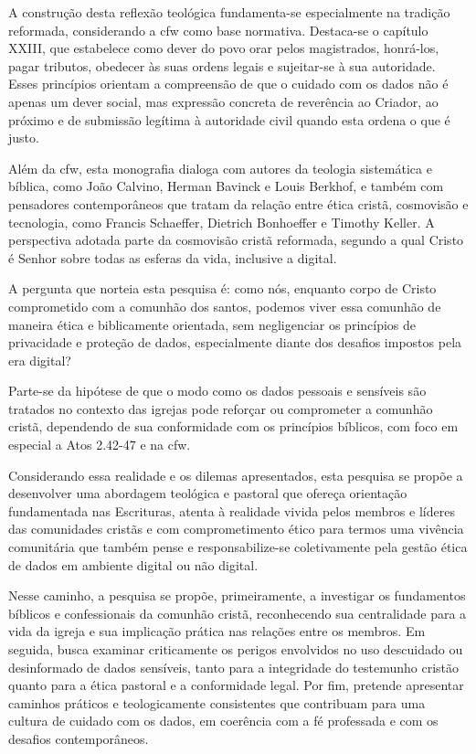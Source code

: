 A construção desta reflexão teológica fundamenta-se especialmente na tradição reformada, considerando a \gls{cfw} como base normativa. Destaca-se o capítulo XXIII, que estabelece como dever do povo orar pelos magistrados, honrá-los, pagar tributos, obedecer às suas ordens legais e sujeitar-se à sua autoridade. Esses princípios orientam a compreensão de que o cuidado com os dados não é apenas um dever social, mas expressão concreta de reverência ao Criador, ao próximo e de submissão legítima à autoridade civil quando esta ordena o que é justo.

Além da \gls{cfw}, esta monografia dialoga com autores da teologia sistemática e bíblica, como João Calvino, Herman Bavinck e Louis Berkhof, e também com pensadores contemporâneos que tratam da relação entre ética cristã, cosmovisão e tecnologia, como Francis Schaeffer, Dietrich Bonhoeffer e Timothy Keller. A perspectiva adotada parte da cosmovisão cristã reformada, segundo a qual Cristo é Senhor sobre todas as esferas da vida, inclusive a digital.

A pergunta que norteia esta pesquisa é: como nós, enquanto corpo de Cristo comprometido com a comunhão dos santos, podemos viver essa comunhão de maneira ética e biblicamente orientada, sem negligenciar os princípios de privacidade e proteção de dados, especialmente diante dos desafios impostos pela era digital?

Parte-se da hipótese de que o modo como os dados pessoais e sensíveis são tratados no contexto das igrejas pode reforçar ou comprometer a comunhão cristã, dependendo de sua conformidade com os princípios bíblicos, com foco em especial a Atos 2.42-47 e na \gls{cfw}.

Considerando essa realidade e os dilemas apresentados, esta pesquisa se propõe a desenvolver uma abordagem teológica e pastoral que ofereça orientação fundamentada nas Escrituras, atenta à realidade vivida pelos membros e líderes das comunidades cristãs e com comprometimento ético para termos uma vivência comunitária que também pense e responsabilize-se coletivamente pela gestão ética de dados em ambiente digital ou não digital.

Nesse caminho, a pesquisa se propõe, primeiramente, a investigar os fundamentos bíblicos e confessionais da comunhão cristã, reconhecendo sua centralidade para a vida da igreja e sua implicação prática nas relações entre os membros. Em seguida, busca examinar criticamente os perigos envolvidos no uso descuidado ou desinformado de dados sensíveis, tanto para a integridade do testemunho cristão quanto para a ética pastoral e a conformidade legal. Por fim, pretende apresentar caminhos práticos e teologicamente consistentes que contribuam para uma cultura de cuidado com os dados, em coerência com a fé professada e com os desafios contemporâneos.


